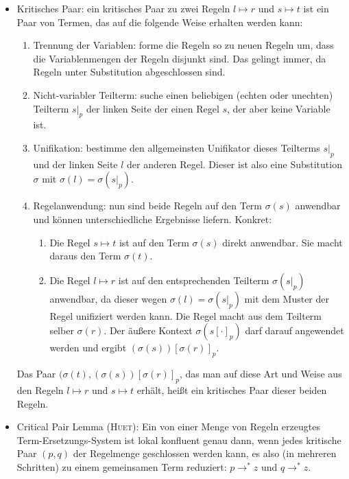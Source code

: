 \documentclass[
  a4paper,
  11pt,
]{scrartcl}
\begin{document}
\begin{itemize}
  \item Kritisches Paar: ein kritisches Paar zu zwei Regeln $l \mapsto r$ und $s
    \mapsto t$ ist ein Paar von Termen, das auf die folgende Weise erhalten
    werden kann:
    \begin{enumerate}
      \item Trennung der Variablen: forme die Regeln so zu neuen Regeln um, dass
        die Variablenmengen der Regeln disjunkt sind. Das gelingt immer, da
        Regeln unter Substitution abgeschlossen sind.

      \item Nicht-variabler Teilterm: suche einen beliebigen (echten oder
        unechten) Teilterm ${s|}_p$ der linken Seite der einen Regel $s$, der
        aber keine Variable ist.

      \item Unifikation: bestimme den allgemeinsten Unifikator dieses Teilterms
        ${s|}_p$ und der linken Seite $l$ der anderen Regel. Dieser ist also
        eine Substitution $\sigma$ mit $\sigma(l) = \sigma({s|}_p)$.

      \item Regelanwendung: nun sind beide Regeln auf den Term $\sigma(s)$
        anwendbar und können unterschiedliche Ergebnisse liefern. Konkret:
        \begin{enumerate}
          \item Die Regel $s \mapsto t$ ist auf den Term $\sigma(s)$ direkt
            anwendbar. Sie macht daraus den Term $\sigma(t)$.

          \item Die Regel $l \mapsto r$ ist auf den entsprechenden Teilterm
            $\sigma({s|}_p)$ anwendbar, da dieser wegen $\sigma(l) =
            \sigma({s|}_p)$ mit dem Muster der Regel unifiziert werden kann. Die
            Regel macht aus dem Teilterm selber $\sigma(r)$. Der äußere Kontext
            $\sigma({s[\cdot]}_p)$ darf darauf angewendet werden und ergibt
            $(\sigma(s)){[\sigma(r)]}_p$.
        \end{enumerate}
    \end{enumerate}

    Das Paar $(\sigma(t), (\sigma(s)){[\sigma(r)]}_p$, das man auf diese Art und
    Weise aus den Regeln $l \mapsto r$ und $s \mapsto t$ erhält, heißt ein
    kritisches Paar dieser beiden Regeln.

  \item Critical Pair Lemma (\textsc{Huet}): Ein von einer Menge von Regeln
    erzeugtes Term-Ersetzungs-System ist lokal konfluent genau dann, wenn jedes
    kritische Paar $(p, q)$ der Regelmenge geschlossen werden kann, es also (in
    mehreren Schritten) zu einem gemeinsamen Term reduziert: $p \rightarrow^* z$
    und $q \rightarrow^* z$.


\end{itemize}
\end{document}
